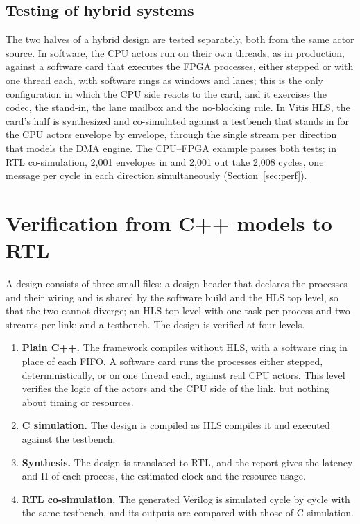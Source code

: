 \documentclass[11pt]{article}
\begin{document}
\subsection{Testing of hybrid systems}
\label{sec:hybridtest}

The two halves of a hybrid design are tested separately, both from the same
actor source. In software, the CPU actors run on their own threads, as in
production, against a software card that executes the FPGA processes, either
stepped or with one thread each, with software rings as windows and lanes; this
is the only configuration in which the CPU side reacts to the card, and it
exercises the codec, the stand-in, the lane mailbox and the no-blocking rule.
In Vitis HLS, the card's half is synthesized and co-simulated against a
testbench that stands in for the CPU actors envelope by envelope, through the
single stream per direction that models the DMA engine. The CPU--FPGA example
passes both tests; in RTL co-simulation, 2{,}001 envelopes in and 2{,}001 out
take 2{,}008 cycles, one message per cycle in each direction simultaneously
(Section~\ref{sec:perf}).

\section{Verification from C++ models to RTL}
\label{sec:verify}

A design consists of three small files: a design header that declares the
processes and their wiring and is shared by the software build and the HLS top
level, so that the two cannot diverge; an HLS top level with one task per
process and two streams per link; and a testbench. The design is verified at
four levels.

\begin{enumerate}[leftmargin=1.6em]
  \item \textbf{Plain C++.} The framework compiles without HLS, with a
  software ring in place of each FIFO. A software card runs the processes
  either stepped, deterministically, or on one thread each, against real CPU
  actors. This level verifies the logic of the actors and the CPU side of the
  link, but nothing about timing or resources.
  \item \textbf{C simulation.} The design is compiled as HLS compiles it and
  executed against the testbench.
  \item \textbf{Synthesis.} The design is translated to RTL, and the report
  gives the latency and II of each process, the estimated clock and the
  resource usage.
  \item \textbf{RTL co-simulation.} The generated Verilog is simulated cycle
  by cycle with the same testbench, and its outputs are compared with those of
  C simulation.
\end{enumerate}
\end{document}
